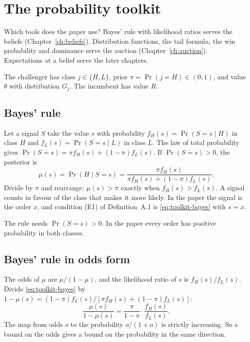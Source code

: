 \chapter{The probability toolkit}\label{ch:toolkit}

\begin{chapterplan}
Which tools does the paper use? Bayes' rule with likelihood ratios serves the beliefs (Chapter~\ref{ch:beliefs}).
Distribution functions, the tail formula, the win probability and dominance serve the auction
(Chapter~\ref{ch:auction}). Expectations at a belief serve the later chapters.
\end{chapterplan}

The challenger has class \(j\in\{H,L\}\), prior \(\pi=\Pr(j=H)\in(0,1)\), and value \(\theta\) with distribution \(G_j\). The incumbent has value \(R\).

\section{Bayes' rule}\label{sec:toolkit-bayes}

Let a signal \(S\) take the value \(s\) with probability \(f_H(s)=\Pr(S=s\mid H)\) in class \(H\) and
\(f_L(s)=\Pr(S=s\mid L)\) in class \(L\). The law of total probability gives \(\Pr(S=s)=\pi f_H(s)+(1-\pi)f_L(s)\).
If \(\Pr(S=s)>0\), the posterior is
\begin{equation}\label{eq:toolkit-bayes}
\mu(s)=\Pr(H\mid S=s)=\frac{\pi f_H(s)}{\pi f_H(s)+(1-\pi)f_L(s)}.
\end{equation}
Divide by \(\pi\) and rearrange: \(\mu(s)>\pi\) exactly when \(f_H(s)>f_L(s)\). A signal counts in favour of the class
that makes it more likely. In the paper the signal is the order \(x\), and condition (E1) of Definition~A.1 is
\eqref{eq:toolkit-bayes} with \(s=x\).

The rule needs \(\Pr(S=s)>0\). In the paper every order has positive probability in both classes.

\section{Bayes' rule in odds form}\label{sec:toolkit-odds}

The odds of \(\mu\) are \(\mu/(1-\mu)\), and the likelihood ratio of \(s\) is \(f_H(s)/f_L(s)\). Divide
\eqref{eq:toolkit-bayes} by \(1-\mu(s)=(1-\pi)f_L(s)/[\pi f_H(s)+(1-\pi)f_L(s)]\):
\begin{equation}\label{eq:toolkit-odds}
\frac{\mu(s)}{1-\mu(s)}=\frac{\pi}{1-\pi}\cdot\frac{f_H(s)}{f_L(s)}.
\end{equation}
The map from odds \(o\) to the probability \(o/(1+o)\) is strictly increasing. So a bound on the odds gives a bound
on the probability in the same direction.

